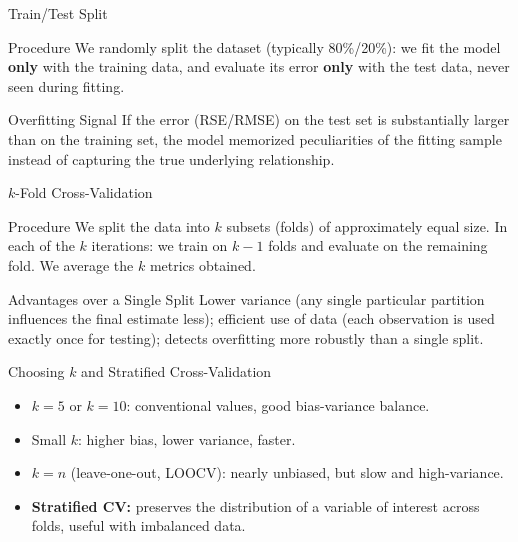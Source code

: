 \documentclass[10pt, aspectratio=169]{beamer}
\begin{document}
\begin{frame}{Train/Test Split}
  \footnotesize
  \begin{block}{Procedure}
    We randomly split the dataset (typically 80\%/20\%): we fit the model \textbf{only} with the training data, and evaluate its error \textbf{only} with the test data, never seen during fitting.
  \end{block}
  \pause

  \vspace{0.1cm}
  \begin{alertblock}{Overfitting Signal}
    If the error (RSE/RMSE) on the test set is substantially larger than on the training set, the model memorized peculiarities of the fitting sample instead of capturing the true underlying relationship.
  \end{alertblock}
\end{frame}

\begin{frame}{$k$-Fold Cross-Validation}
  \footnotesize
  \begin{block}{Procedure}
    We split the data into $k$ subsets (folds) of approximately equal size. In each of the $k$ iterations: we train on $k-1$ folds and evaluate on the remaining fold. We average the $k$ metrics obtained.
  \end{block}
  \pause

  \vspace{0.1cm}
  \begin{alertblock}{Advantages over a Single Split}
    Lower variance (any single particular partition influences the final estimate less); efficient use of data (each observation is used exactly once for testing); detects overfitting more robustly than a single split.
  \end{alertblock}
\end{frame}

\begin{frame}{Choosing $k$ and Stratified Cross-Validation}
  \footnotesize
  \begin{itemize}\itemsep=0.1cm
    \item $k=5$ or $k=10$: conventional values, good bias-variance balance. \pause
    \item Small $k$: higher bias, lower variance, faster. \pause
    \item $k=n$ (leave-one-out, LOOCV): nearly unbiased, but slow and high-variance. \pause
    \item \textbf{Stratified CV:} preserves the distribution of a variable of interest across folds, useful with imbalanced data.
  \end{itemize}
\end{frame}
\end{document}
